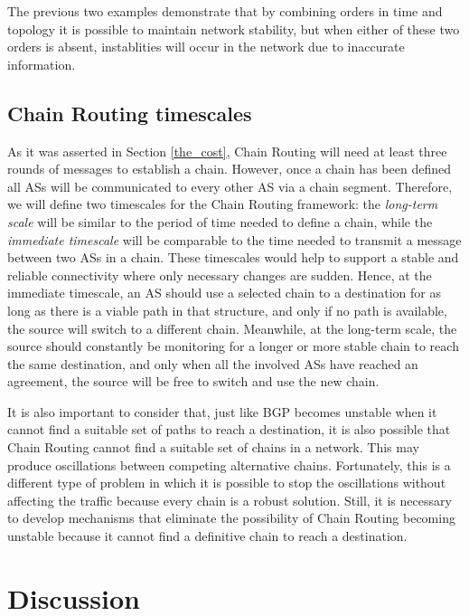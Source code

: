 \documentclass[5p,twocolumn]{elsarticle}
\begin{document}
The previous two examples demonstrate that by combining orders in time and topology it is possible to maintain network stability, but when either of these two orders is absent, instablities will occur in the network due to inaccurate information.


\subsection{Chain Routing timescales}\label{timescales}

As it was asserted in Section \ref{the_cost}, Chain Routing will need at least three rounds of messages to establish a chain. However, once a chain has been defined all ASs will be communicated to every other AS via a chain segment. Therefore, we will define two timescales for the Chain Routing framework: the \emph{long-term scale} will be similar to the period of time needed to define a chain, while the \emph{immediate timescale} will be comparable to the time needed to transmit a message between two ASs in a chain. These timescales would help to support a stable and reliable connectivity where only necessary changes are sudden. Hence, at the immediate timescale, an AS should use a selected chain to a destination for as long as there is a viable path in that structure, and only if no path is available, the source will switch to a different chain. Meanwhile, at the long-term scale, the source should constantly be monitoring for a longer or more stable chain to reach the same destination, and only when all the involved ASs have reached an agreement, the source will be free to switch and use the new chain.

It is also important to consider that, just like BGP becomes unstable when it cannot find a suitable set of paths to reach a destination, it is also possible that Chain Routing cannot find a suitable set of chains in a network. This may produce oscillations between competing alternative chains. Fortunately, this is a different type of problem in which it is possible to stop the oscillations without affecting the traffic because every chain is a robust solution. Still, it is necessary to develop mechanisms that eliminate the possibility of Chain Routing becoming unstable because it cannot find a definitive chain to reach a destination.




\section{Discussion}\label{discusion}
\end{document}
